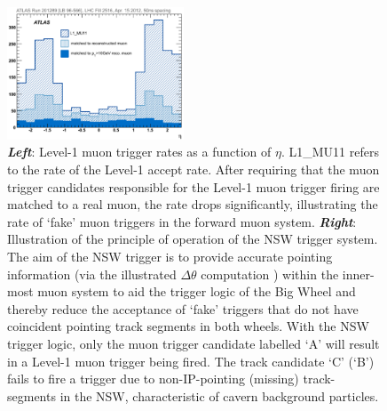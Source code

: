 \begin{figure}[!htb]
    \begin{center}
        \includegraphics[width=0.47\textwidth]{figures/nsw/nsw_l1mu_rates}
        \caption{
            \textbf{\textit{Left}}: Level-1 muon trigger rates as a function of $\eta$. L1\_MU11 refers to the
                rate of the Level-1 accept rate. After requiring that the muon trigger candidates
                responsible for the Level-1 muon trigger firing are matched to a real muon, the
                rate drops significantly, illustrating the rate of `fake' muon triggers in the
                forward muon system.
            \textbf{\textit{Right}}: Illustration of the principle of operation of the NSW trigger system.
                The aim of the NSW trigger is to provide accurate pointing information (via the illustrated $\Delta \theta$ computation {\color{red}{DESCRIBE THIS IN ONE SENTENCE IN MAIN BODY?}}) within
                the inner-most muon system to aid the trigger logic of the Big Wheel and thereby reduce the acceptance of `fake' triggers that
                do not have coincident pointing track segments in both wheels.
                With the NSW trigger logic, only the muon trigger candidate labelled `A' will result
                in a Level-1 muon trigger being fired.
                The track candidate `C' (`B') fails to fire a trigger due to non-IP-pointing (missing) track-segments in the NSW,
                characteristic of cavern background particles.
        }
        \label{fig:l1mu_rates}
    \end{center}
\end{figure}


